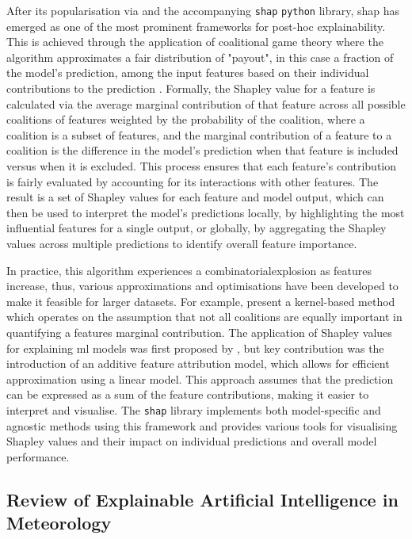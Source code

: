 After its popularisation via \cite{Lundberg2017} and the accompanying \texttt{shap} \texttt{python} library, \acrfull{shap} has emerged as one of the most prominent frameworks for post-hoc explainability. This is achieved through the application of coalitional game theory where the algorithm approximates a fair distribution of "payout", in this case a fraction of the model's prediction, among the input features based on their individual contributions to the prediction \citep{Shapley1953}. Formally, the Shapley value for a feature is calculated via the average marginal contribution of that feature across all possible coalitions of features weighted by the probability of the coalition, where a coalition is a subset of features, and the marginal contribution of a feature to a coalition is the difference in the model's prediction when that feature is included versus when it is excluded. This process ensures that each feature's contribution is fairly evaluated by accounting for its interactions with other features. The result is a set of Shapley values for each feature and model output, which can then be used to interpret the model's predictions locally, by highlighting the most influential features for a single output, or globally, by aggregating the Shapley values across multiple predictions to identify overall feature importance.

In practice, this algorithm experiences a \gls{combinatorialexplosion} as features increase, thus, various approximations and optimisations have been developed to make it feasible for larger datasets. For example, \cite{Lundberg2017} present a kernel-based method which operates on the assumption that not all coalitions are equally important in quantifying a features marginal contribution. The application of Shapley values for explaining \acrshort{ml} models was first proposed by \cite{trumbelj2011}, but \cite{Lundberg2017} key contribution was the introduction of an additive feature attribution model, which allows for efficient approximation using a linear model. This approach assumes that the prediction can be expressed as a sum of the feature contributions, making it easier to interpret and visualise. The \texttt{shap} library implements both model-specific and agnostic methods using this framework and provides various tools for visualising Shapley values and their impact on individual predictions and overall model performance.

\subsection{Review of Explainable Artificial Intelligence in Meteorology}

